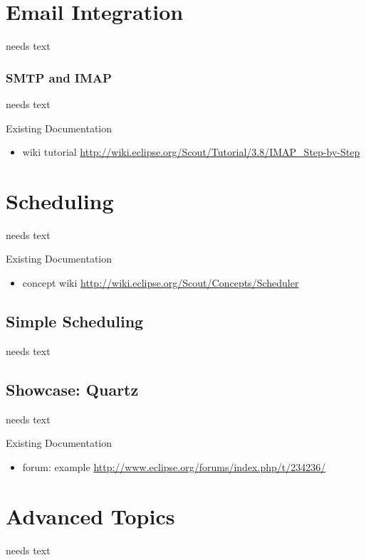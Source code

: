 \documentclass[a4paper,10pt,twoside]{book}
\begin{document}
\chapter{Email Integration}
needs text

\subsection{SMTP and IMAP}
needs text

\noindent Existing Documentation
\begin{itemize}
  \item wiki tutorial \url{http://wiki.eclipse.org/Scout/Tutorial/3.8/IMAP_Step-by-Step}
  \end{itemize}

\chapter{Scheduling}
needs text

\noindent Existing Documentation
\begin{itemize}
  \item concept wiki \url{http://wiki.eclipse.org/Scout/Concepts/Scheduler}
\end{itemize}

\section{Simple Scheduling}
needs text

\section{Showcase: Quartz}
needs text

\noindent Existing Documentation
\begin{itemize}
  \item forum: example \url{http://www.eclipse.org/forums/index.php/t/234236/}
\end{itemize}

\chapter{Advanced Topics}
needs text
\end{document}
